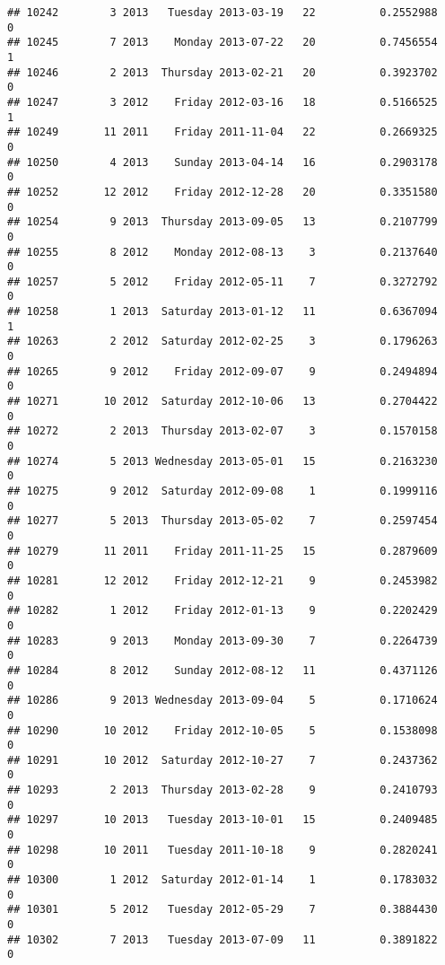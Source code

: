 \documentclass[
]{article}
\begin{document}
\begin{verbatim}
## 10242        3 2013   Tuesday 2013-03-19   22          0.2552988             0
## 10245        7 2013    Monday 2013-07-22   20          0.7456554             1
## 10246        2 2013  Thursday 2013-02-21   20          0.3923702             0
## 10247        3 2012    Friday 2012-03-16   18          0.5166525             1
## 10249       11 2011    Friday 2011-11-04   22          0.2669325             0
## 10250        4 2013    Sunday 2013-04-14   16          0.2903178             0
## 10252       12 2012    Friday 2012-12-28   20          0.3351580             0
## 10254        9 2013  Thursday 2013-09-05   13          0.2107799             0
## 10255        8 2012    Monday 2012-08-13    3          0.2137640             0
## 10257        5 2012    Friday 2012-05-11    7          0.3272792             0
## 10258        1 2013  Saturday 2013-01-12   11          0.6367094             1
## 10263        2 2012  Saturday 2012-02-25    3          0.1796263             0
## 10265        9 2012    Friday 2012-09-07    9          0.2494894             0
## 10271       10 2012  Saturday 2012-10-06   13          0.2704422             0
## 10272        2 2013  Thursday 2013-02-07    3          0.1570158             0
## 10274        5 2013 Wednesday 2013-05-01   15          0.2163230             0
## 10275        9 2012  Saturday 2012-09-08    1          0.1999116             0
## 10277        5 2013  Thursday 2013-05-02    7          0.2597454             0
## 10279       11 2011    Friday 2011-11-25   15          0.2879609             0
## 10281       12 2012    Friday 2012-12-21    9          0.2453982             0
## 10282        1 2012    Friday 2012-01-13    9          0.2202429             0
## 10283        9 2013    Monday 2013-09-30    7          0.2264739             0
## 10284        8 2012    Sunday 2012-08-12   11          0.4371126             0
## 10286        9 2013 Wednesday 2013-09-04    5          0.1710624             0
## 10290       10 2012    Friday 2012-10-05    5          0.1538098             0
## 10291       10 2012  Saturday 2012-10-27    7          0.2437362             0
## 10293        2 2013  Thursday 2013-02-28    9          0.2410793             0
## 10297       10 2013   Tuesday 2013-10-01   15          0.2409485             0
## 10298       10 2011   Tuesday 2011-10-18    9          0.2820241             0
## 10300        1 2012  Saturday 2012-01-14    1          0.1783032             0
## 10301        5 2012   Tuesday 2012-05-29    7          0.3884430             0
## 10302        7 2013   Tuesday 2013-07-09   11          0.3891822             0

\end{verbatim}
\end{document}
